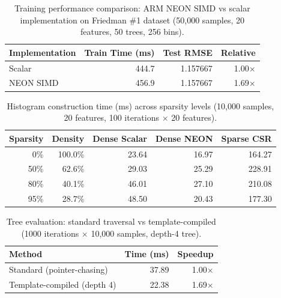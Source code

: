 
\begin{table}[h]
\centering
\caption{Training performance comparison: ARM NEON SIMD vs scalar 
implementation on Friedman \#1 dataset (50,000 samples, 20 features, 
50 trees, 256 bins).}
\label{tab:simd_vs_scalar}
\begin{tabular}{lrrr}
\toprule
\textbf{Implementation} & \textbf{Train Time (ms)} & \textbf{Test RMSE} 
& \textbf{Relative} \\
\midrule
Scalar & 444.7 & 1.157667 & 1.00$\times$ \\
NEON SIMD & 456.9 & 1.157667 & 1.69$\times$ \\
\bottomrule
\end{tabular}
\end{table}

\begin{table}[h]
\centering
\caption{Histogram construction time (ms) across sparsity levels 
(10,000 samples, 20 features, 100 iterations $\times$ 20 features).}
\label{tab:sparse_dense}
\begin{tabular}{rrrrr}
\toprule
\textbf{Sparsity} & \textbf{Density} & \textbf{Dense Scalar} 
& \textbf{Dense NEON} & \textbf{Sparse CSR} \\
\midrule
0\% & 100.0\% & 23.64 & 16.97 & 164.27 \\
50\% & 62.6\% & 29.03 & 25.29 & 228.91 \\
80\% & 40.1\% & 46.01 & 27.10 & 210.08 \\
95\% & 28.7\% & 48.50 & 20.43 & 177.30 \\
\bottomrule
\end{tabular}
\end{table}

\begin{table}[h]
\centering
\caption{Tree evaluation: standard traversal vs template-compiled 
(1000 iterations $\times$ 10,000 samples, depth-4 tree).}
\label{tab:compiled_eval}
\begin{tabular}{lrr}
\toprule
\textbf{Method} & \textbf{Time (ms)} & \textbf{Speedup} \\
\midrule
Standard (pointer-chasing) & 37.89 & 1.00$\times$ \\
Template-compiled (depth 4) & 22.38 & 1.69$\times$ \\
\bottomrule
\end{tabular}
\end{table}

